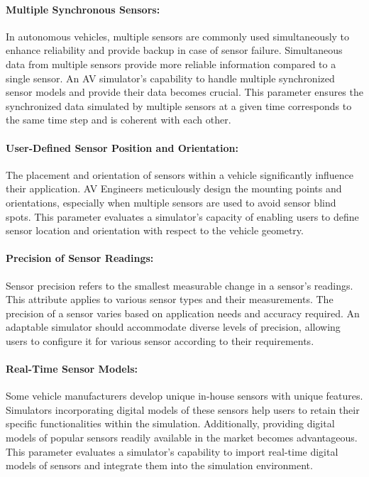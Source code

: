 \documentclass[12pt,twoside,a4paper,parskip]{scrbook} %
\begin{document}
\paragraph*{Multiple Synchronous Sensors:}
In autonomous vehicles, multiple sensors are commonly used simultaneously to enhance reliability and provide backup in case of sensor failure. Simultaneous data from multiple sensors provide more reliable information compared to a single sensor. An AV simulator's capability to handle multiple synchronized sensor models and provide their data becomes crucial. This parameter ensures the synchronized data simulated by multiple sensors at a given time corresponds to the same time step and is coherent with each other.

\paragraph*{User-Defined Sensor Position and Orientation:}
The placement and orientation of sensors within a vehicle significantly influence their application. AV Engineers meticulously design the mounting points and orientations, especially when multiple sensors are used to avoid sensor blind spots. This parameter evaluates a simulator's capacity of enabling users to define sensor location and orientation with respect to the vehicle geometry.

\paragraph*{Precision of Sensor Readings:}
Sensor precision refers to the smallest measurable change in a sensor's readings. This attribute applies to various sensor types and their measurements. The precision of a sensor varies based on application needs and accuracy required. An adaptable simulator should accommodate diverse levels of precision, allowing users to configure it for various sensor according to their requirements.

\paragraph*{Real-Time Sensor Models:}
Some vehicle manufacturers develop unique in-house sensors with unique features. Simulators incorporating digital models of these sensors help users to retain their specific functionalities within the simulation. Additionally, providing digital models of popular sensors readily available in the market becomes advantageous. This parameter evaluates a simulator's capability to import real-time digital models of sensors and integrate them into the simulation environment.
\end{document}
